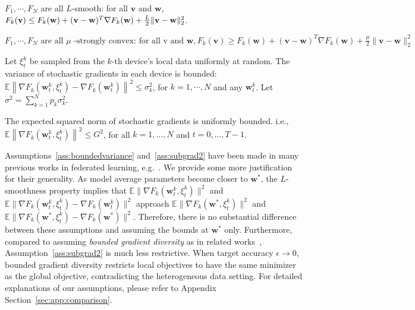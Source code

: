 
\begin{assumption}[L-smooth]
	$F_{1}, \cdots, F_{N}$ are all $L$-smooth: for all  $\mathbf{v}$  and $\mathbf{w}$, $F_{k}(\mathbf{v}) \leq F_{k}(\mathbf{w})+(\mathbf{v}- \\ \mathbf{w})^{T} \nabla F_{k}(\mathbf{w})+\frac{L}{2}\|\mathbf{v}-\mathbf{w}\|_{2}^{2}$.
	\label{ass:lsmooth}
\end{assumption}
\begin{assumption}
	$	F_{1}, \cdots, F_{N} \text { are all } \mu \text { -strongly convex: for all v and } \mathbf{w}, F_{k}(\mathbf{v}) \geq F_{k}(\mathbf{w})+(\mathbf{v}-\mathbf{w})^{T} \nabla F_{k}(\mathbf{w})+\frac{\mu}{2}\|\mathbf{v}-\mathbf{w}\|_{2}^{2}$
	\label{ass:stroncvx}
\end{assumption}
\begin{assumption}
	Let $\xi_{t}^{k}$ be sampled from the $k$-th device's local data uniformly at random. The variance of stochastic gradients in each device is bounded: $\mathbb{E}\left\|\nabla F_{k}\left(\mathbf{w}_{t}^{k}, \xi_{t}^{k}\right)-\nabla F_{k}\left(\mathbf{w}_{t}^{k}\right)\right\|^{2} \leq \sigma_{k}^{2}$,
	for $k=1, \cdots, N$ and any $\mathbf{w}_{t}^{k}$. Let $\sigma^2=\sum_{k=1}^{N}p_k\sigma_{k}^{2}$.
	\label{ass:boundedvariance}
\end{assumption}
\begin{assumption}
	The expected squared norm of stochastic gradients is uniformly bounded. i.e.,
	$\mathbb{E}\left\|\nabla F_{k}\left(\mathbf{w}_{t}^{k}, \xi_{t}^{k}\right)\right\|^{2} \leq G^{2}$, for all $k = 1,..., N$ and $t=0, \dots, T-1$.
	\label{ass:subgrad2}
\end{assumption}
Assumptions~\ref{ass:boundedvariance} and~\ref{ass:subgrad2} have been made in many previous
works in federated learning, e.g.~\cite{yu2019parallel,li2019convergence,stich2018local}. We provide some more justification for their generality. As model average parameters become
closer to $\mathbf{w}^{\ast}$, the $L$-smoothness property implies
that $\mathbb{E}\|\nabla F_{k}(\mathbf{w}_{t}^{k},\xi_{t}^{k})\|^{2}$
and $\mathbb{E}\|\nabla F_{k}(\mathbf{w}_{t}^{k},\xi_{t}^{k})-\nabla F_{k}(\mathbf{w}_{t}^{k})\|^{2}$
approach $\mathbb{E}\|\nabla F_{k}(\mathbf{w}^{\ast},\xi_{t}^{k})\|^{2}$
and $\mathbb{E}\|\nabla F_{k}(\mathbf{w}^{\ast},\xi_{t}^{k})-\nabla F_{k}(\mathbf{w}^{\ast})\|^{2}$.
Therefore, there is no substantial difference between these assumptions
and assuming the bounds at $\mathbf{w}^{\ast}$ only. Furthermore, compared to assuming \textit{bounded gradient diversity} as in related works~\cite{haddadpour2019convergence,li2018federated}, Assumption~\ref{ass:subgrad2} is much less restrictive. When target accuracy $\epsilon \rightarrow 0$,
bounded gradient diversity restricts local objectives to have the same minimizer as the global objective, contradicting the heterogeneous data setting. 
For detailed explanations of our assumptions, please refer to Appendix Section~\ref{sec:app:comparison}.

